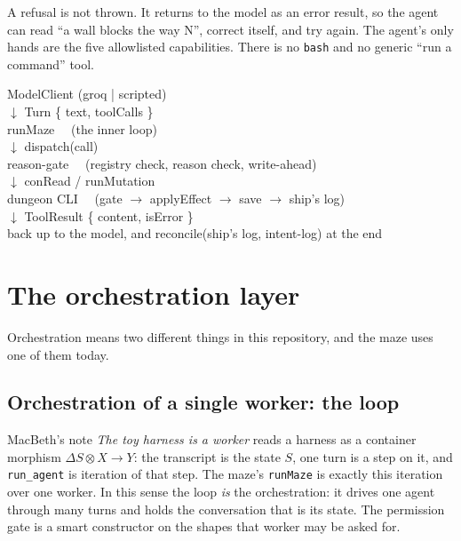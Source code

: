 \documentclass[11pt]{article}
\newcommand{\code}[1]{\texttt{#1}}
\begin{document}
A refusal is not thrown. It returns to the model as an error result, so the agent
can read ``a wall blocks the way N'', correct itself, and try again. The agent's
only hands are the five allowlisted capabilities. There is no \code{bash} and no
generic ``run a command'' tool.

\begin{center}
\begin{tcolorbox}[colback=codebg,colframe=rule,boxrule=0.5pt,arc=2pt,width=\linewidth]
\ttfamily\small
ModelClient (groq | scripted)\\
\hspace*{2em}$\downarrow$ Turn \{ text, toolCalls \}\\
runMaze \ \ (the inner loop)\\
\hspace*{2em}$\downarrow$ dispatch(call)\\
reason-gate \ \ (registry check, reason check, write-ahead)\\
\hspace*{2em}$\downarrow$ conRead / runMutation\\
dungeon CLI \ \ (gate $\rightarrow$ applyEffect $\rightarrow$ save $\rightarrow$ ship's log)\\
\hspace*{2em}$\downarrow$ ToolResult \{ content, isError \}\\
back up to the model, and reconcile(ship's log, intent-log) at the end
\end{tcolorbox}
\end{center}

\section{The orchestration layer}

Orchestration means two different things in this repository, and the maze uses
one of them today.

\subsection{Orchestration of a single worker: the loop}

MacBeth's note \emph{The toy harness is a worker} reads a harness as a container
morphism $\Delta S \otimes X \to Y$: the transcript is the state $S$, one turn is
a step on it, and \code{run\_agent} is iteration of that step. The maze's
\code{runMaze} is exactly this iteration over one worker. In this sense the loop
\emph{is} the orchestration: it drives one agent through many turns and holds the
conversation that is its state. The permission gate is a smart constructor on the
shapes that worker may be asked for.
\end{document}
